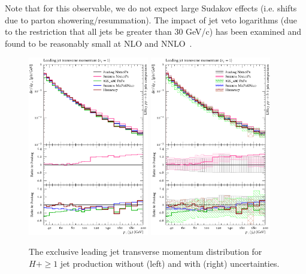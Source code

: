 Note that for this observable, we do not expect large Sudakov effects
(i.e. shifts due to parton showering/resummation). The impact of jet
veto logarithms (due to the restriction that all jets be greater than
30 GeV/c) has been examined and found to be reasonably small at NLO
and NNLO~\cite{monni}.


\begin{figure}[t!]
  \centering
  \includegraphics[width=0.47\textwidth]{figures/hjetscomp_u_jet1_pT_excl.pdf}
  \hfill
  \includegraphics[width=0.47\textwidth]{figures/hjetscomp_jet1_pT_excl.pdf}
  \caption{
    The exclusive leading jet transverse momentum distribution for
    $H+\ge1$ jet production without (left) and with (right) uncertainties.
    \label{fig:higgscomp:results:1obs:j1pt_excl}
  }
\end{figure}

